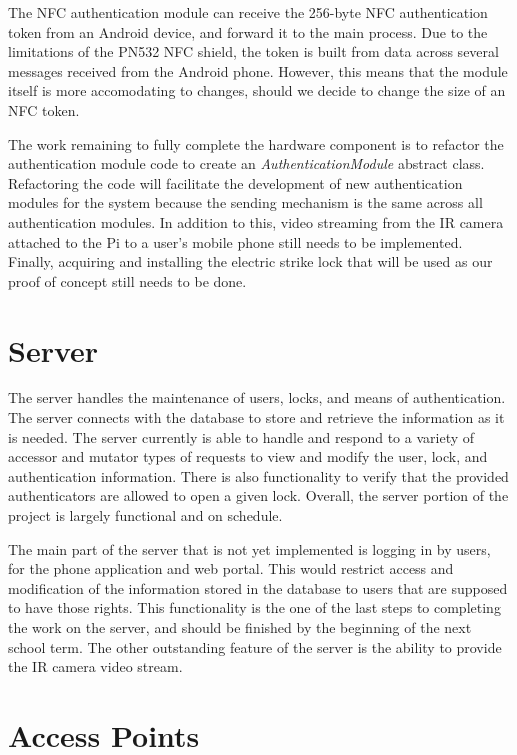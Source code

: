 \documentclass{article}
\begin{document}
The NFC authentication module can receive the 256-byte NFC authentication token from an 
Android device, and forward it to the main process. Due to the limitations of the PN532 NFC shield, the token is built 
from data across several messages received from the Android phone. However, this means that the module itself is more 
accomodating to changes, should we decide to change the size of an NFC token.

The work remaining to fully complete the hardware component is to refactor the authentication module code to create an 
\emph{AuthenticationModule} abstract class. Refactoring the code will facilitate the development of new authentication
modules for the system because the sending mechanism is the same across all authentication modules. In addition to this,
video streaming from the IR camera attached to the Pi to a user's mobile phone still needs to be implemented. Finally,
acquiring and installing the electric strike lock that will be used as our proof of concept still needs to be done.

\section{Server}

The server handles the maintenance of users, locks, and means of authentication. The server connects with the database
to store and retrieve the information as it is needed. The server currently is able to handle and respond to a variety
of accessor and mutator types of requests to view and modify the user, lock, and authentication information. There is
also functionality to verify that the provided authenticators are allowed to open a given lock. Overall, the server
portion of the project is largely functional and on schedule.

The main part of the server that is not yet implemented is logging in by users, for the phone application and web portal.
This would restrict access and modification of the information stored in the database to users that are supposed to have
those rights. This functionality is the one of the last steps to completing the work on the server, and should be finished
by the beginning of the next school term. The other outstanding feature of the server is the ability to provide the IR
camera video stream.

\section{Access Points}
\end{document}
